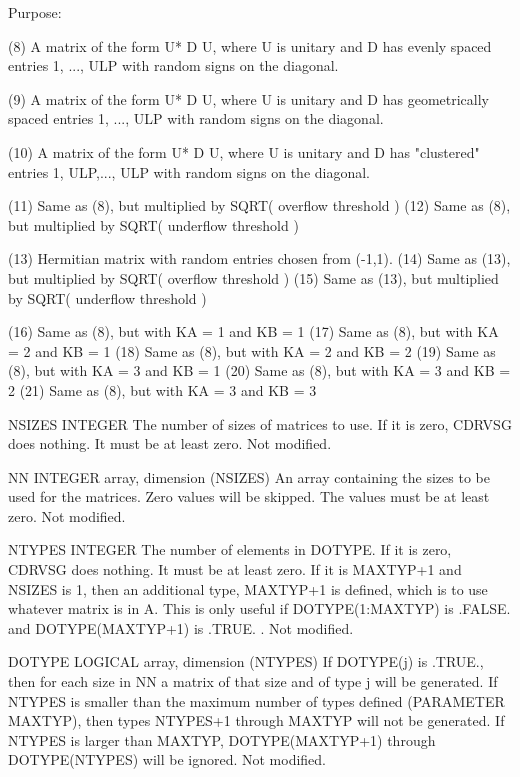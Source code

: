 \begin{DoxyParagraph}{Purpose\+: }
\begin{DoxyVerb}
      (8)  A matrix of the form  U* D U, where U is unitary and
           D has evenly spaced entries 1, ..., ULP with random signs
           on the diagonal.

      (9)  A matrix of the form  U* D U, where U is unitary and
           D has geometrically spaced entries 1, ..., ULP with random
           signs on the diagonal.

      (10) A matrix of the form  U* D U, where U is unitary and
           D has "clustered" entries 1, ULP,..., ULP with random
           signs on the diagonal.

      (11) Same as (8), but multiplied by SQRT( overflow threshold )
      (12) Same as (8), but multiplied by SQRT( underflow threshold )

      (13) Hermitian matrix with random entries chosen from (-1,1).
      (14) Same as (13), but multiplied by SQRT( overflow threshold )
      (15) Same as (13), but multiplied by SQRT( underflow threshold )

      (16) Same as (8), but with KA = 1 and KB = 1
      (17) Same as (8), but with KA = 2 and KB = 1
      (18) Same as (8), but with KA = 2 and KB = 2
      (19) Same as (8), but with KA = 3 and KB = 1
      (20) Same as (8), but with KA = 3 and KB = 2
      (21) Same as (8), but with KA = 3 and KB = 3\end{DoxyVerb}
 \begin{DoxyVerb}  NSIZES  INTEGER
          The number of sizes of matrices to use.  If it is zero,
          CDRVSG does nothing.  It must be at least zero.
          Not modified.

  NN      INTEGER array, dimension (NSIZES)
          An array containing the sizes to be used for the matrices.
          Zero values will be skipped.  The values must be at least
          zero.
          Not modified.

  NTYPES  INTEGER
          The number of elements in DOTYPE.   If it is zero, CDRVSG
          does nothing.  It must be at least zero.  If it is MAXTYP+1
          and NSIZES is 1, then an additional type, MAXTYP+1 is
          defined, which is to use whatever matrix is in A.  This
          is only useful if DOTYPE(1:MAXTYP) is .FALSE. and
          DOTYPE(MAXTYP+1) is .TRUE. .
          Not modified.

  DOTYPE  LOGICAL array, dimension (NTYPES)
          If DOTYPE(j) is .TRUE., then for each size in NN a
          matrix of that size and of type j will be generated.
          If NTYPES is smaller than the maximum number of types
          defined (PARAMETER MAXTYP), then types NTYPES+1 through
          MAXTYP will not be generated.  If NTYPES is larger
          than MAXTYP, DOTYPE(MAXTYP+1) through DOTYPE(NTYPES)
          will be ignored.
          Not modified.


\end{DoxyVerb}
\end{DoxyParagraph}
